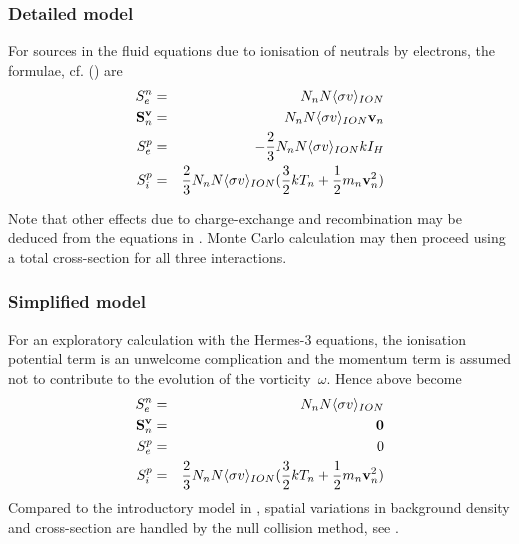 \subsubsection{Detailed model}\label{sec:modet}
For sources in the fluid equations due to ionisation of neutrals by electrons, the
formulae, cf.  (\cite[Eqs.(34)-(36)]{Ha13Benc}) are
\begin{eqnarray}
\label{eq:Sne} S^n_e&=& N_n N \langle\sigma v\rangle_{ION} \\
\label{eq:Svn} {\bf S}^{\bf v}_n&=&N_n N \langle\sigma v\rangle_{ION} {\bf v}_n \\
\label{eq:Spe} S^p_e&=& -\frac{2}{3} N_n N \langle\sigma v\rangle_{ION} k I_H\\
\label{eq:Spi} S^p_i&=& \frac{2}{3} N_n N \langle\sigma v\rangle_{ION} (\frac{3}{2} kT_n + \frac{1}{2} m_n {\bf v}_n^2 )
\end{eqnarray}

Note that other effects due to charge-exchange and recombination may be deduced from
the equations in . Monte Carlo calculation may then proceed using a total
cross-section for all three interactions.
\subsubsection{Simplified model}\label{sec:modsimp}
For an exploratory calculation with the Hermes-3 equations, the ionisation potential term is an unwelcome complication
and the momentum term is assumed not to contribute to the evolution of the vorticity~$\omega$.
Hence  above become
\begin{eqnarray}
\label{eq:Snesimp} S^n_e&=& N_n N \langle\sigma v\rangle_{ION} \\
\label{eq:Svnsimp} {\bf S}^{\bf v}_n&=& {\bf 0} \\
\label{eq:Spesimp} S^p_e&=& 0 \\
\label{eq:Spisimp} S^p_i&=& \frac{2}{3} N_n N \langle\sigma v\rangle_{ION} (\frac{3}{2} kT_n + \frac{1}{2} m_n {\bf v}_n^2 )
\end{eqnarray}
Compared to the introductory model in , spatial variations in
background density and cross-section are handled by the null collision method, see .

